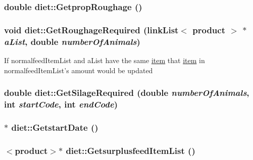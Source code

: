 \label{classdiet_a6673b1f0e3b2b033b73c16a7e096ee87}
\hypertarget{classdiet_a90e75f05792ef5fe58c8a18be70af856}{
\subsubsection[{GetpropRoughage}]{\setlength{\rightskip}{0pt plus 5cm}double diet::GetpropRoughage ()}}
\label{classdiet_a90e75f05792ef5fe58c8a18be70af856}
\hypertarget{classdiet_a6745f2d95c6f4c86857f4490086112bd}{
\subsubsection[{GetRoughageRequired}]{\setlength{\rightskip}{0pt plus 5cm}void diet::GetRoughageRequired ({\bf linkList}$<$ {\bf product} $>$ $\ast$ {\em aList}, \/  double {\em numberOfAnimals})}}
\label{classdiet_a6745f2d95c6f4c86857f4490086112bd}
If normalfeedItemList and aList have the same \hyperlink{classitem}{item} that \hyperlink{classitem}{item} in normalfeedItemList's amount would be updated \hypertarget{classdiet_ae87ac77e21a845e5ea1d671a85703761}{
\subsubsection[{GetSilageRequired}]{\setlength{\rightskip}{0pt plus 5cm}double diet::GetSilageRequired (double {\em numberOfAnimals}, \/  int {\em startCode}, \/  int {\em endCode})}}
\label{classdiet_ae87ac77e21a845e5ea1d671a85703761}
\hypertarget{classdiet_a66183f7ce65baa947f8aa77fa9521a65}{
\subsubsection[{GetstartDate}]{$\ast$ diet::GetstartDate ()}}
\label{classdiet_a66183f7ce65baa947f8aa77fa9521a65}
\hypertarget{classdiet_a0d62c160e28ce12200c5bed5eede85f3}{
\subsubsection[{GetsurplusfeedItemList}]{$<${\bf product}$>$$\ast$ diet::GetsurplusfeedItemList ()}}
